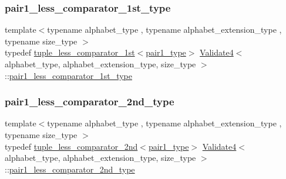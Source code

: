 \subsubsection{\texorpdfstring{pair1\+\_\+less\+\_\+comparator\+\_\+1st\+\_\+type}{pair1\_less\_comparator\_1st\_type}}
{\footnotesize\ttfamily template$<$typename alphabet\+\_\+type , typename alphabet\+\_\+extension\+\_\+type , typename size\+\_\+type $>$ \\
typedef \hyperlink{structtuple__less__comparator__1st}{tuple\+\_\+less\+\_\+comparator\+\_\+1st}$<$\hyperlink{class_validate4_aaa2fcb80a05115eb4ca02ab23df8827e}{pair1\+\_\+type}$>$ \hyperlink{class_validate4}{Validate4}$<$ alphabet\+\_\+type, alphabet\+\_\+extension\+\_\+type, size\+\_\+type $>$\+::\hyperlink{class_validate4_af01005bf9ba711e95fc52fc41e323716}{pair1\+\_\+less\+\_\+comparator\+\_\+1st\+\_\+type}\hspace{0.3cm}{\ttfamily [private]}}

\mbox{\label{class_validate4_a67166f1b6f64e5d8887d9a5aa6072346}} 
\subsubsection{\texorpdfstring{pair1\+\_\+less\+\_\+comparator\+\_\+2nd\+\_\+type}{pair1\_less\_comparator\_2nd\_type}}
{\footnotesize\ttfamily template$<$typename alphabet\+\_\+type , typename alphabet\+\_\+extension\+\_\+type , typename size\+\_\+type $>$ \\
typedef \hyperlink{structtuple__less__comparator__2nd}{tuple\+\_\+less\+\_\+comparator\+\_\+2nd}$<$\hyperlink{class_validate4_aaa2fcb80a05115eb4ca02ab23df8827e}{pair1\+\_\+type}$>$ \hyperlink{class_validate4}{Validate4}$<$ alphabet\+\_\+type, alphabet\+\_\+extension\+\_\+type, size\+\_\+type $>$\+::\hyperlink{class_validate4_a67166f1b6f64e5d8887d9a5aa6072346}{pair1\+\_\+less\+\_\+comparator\+\_\+2nd\+\_\+type}\hspace{0.3cm}{\ttfamily [private]}}

\mbox{\label{class_validate4_a40b1f73557cfa4c0b26f56f5038a4c5c}} 
